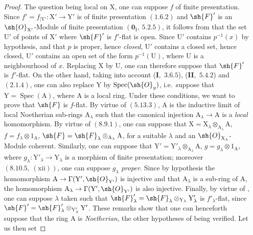 \begin{proof}
The question being local on $\mathrm{X}$, one can suppose $f$ of finite presentation. Since
$f'=f_{|\mathrm{Y}'}:\mathrm{X}'\to\mathrm{Y}'$ is of finite presentation
$(1.6.2)$ and $\sh{F}'$ is an $\sh{O}_{\mathrm{X}'}$-Module of finite presentation $(\mathbf{0}_\mathrm{I},~5.2.5)$, it follows
from  that the set $\mathrm{U}'$ of points of $\mathrm{X}'$ where $\sh{F}'$ is $f'$-flat is open. Since $\mathrm{U}'$
contains $p^{-1}(x)$ by hypothesis, and that $p$ is proper, hence \emph{closed}, $\mathrm{U}'$ contains a closed set, hence closed, $\mathrm{U}'$ contains an
open set of the form $p^{-1}(\mathrm{U})$, where $\mathrm{U}$ is a neighbourhood of $x$. Replacing $\mathrm{X}$ by $\mathrm{U}$, one can therefore
suppose that $\sh{F}'$ is $f'$-flat. On the other hand, taking into account (\textbf{I},~$3.6.5$), (\textbf{II},~$5.4.2$)
and $(2.1.4)$, one can also replace $\mathrm{Y}$ by $\operatorname{Spec}(\sh{O}_y)$, i.e.\ suppose that $\mathrm{Y}=\operatorname{Spec}(\mathrm{A})$,
where $\mathrm{A}$ is a local ring. Under these conditions, we want to prove that $\sh{F}$ is $f$-flat. By virtue
of $(5.13.3)$, $\mathrm{A}$ is the inductive limit of local Noetherian sub-rings $\mathrm{A}_\lambda$ such that
the canonical injection $\mathrm{A}_\lambda\to\mathrm{A}$ is a \emph{local} homomorphism. By virtue of $(8.9.1)$, one
can suppose that $\mathrm{X}=\mathrm{X}_\lambda\otimes_{\mathrm{A}_\lambda}\mathrm{A}$, $f=f_\lambda\otimes 1_\mathrm{A}$, $\sh{F}=\sh{F}_\lambda\otimes_{\mathrm{A}_\lambda}\mathrm{A}$, for a suitable $\lambda$ and an $\sh{O}_{\mathrm{X}_\lambda}$-Module coherent.
Similarly, one can suppose that $\mathrm{Y}'=\mathrm{Y}'_\lambda\otimes_{\mathrm{A}_\lambda}\mathrm{A}$, $g=g_\lambda\otimes 1_\mathrm{A}$, where $g_\lambda:\mathrm{Y}'_\lambda\to\mathrm{Y}_\lambda$ is a
morphism of finite presentation; moreover $(8.10.5,~(\text{xii}))$, one can suppose $g_\lambda$
\emph{proper}. Since by hypothesis the homomorphism $\mathrm{A}\to\Gamma(\mathrm{Y}',\sh{O}_{\mathrm{Y}'})$ is injective and that $\mathrm{A}_\lambda$
is a sub-ring of $\mathrm{A}$, the homomorphism $\mathrm{A}_\lambda\to\Gamma(\mathrm{Y}',\sh{O}_{\mathrm{Y}'})$ is also injective. Finally,
by virtue of , one can suppose $\lambda$ taken such that $\sh{F}'_\lambda=\sh{F}_\lambda\otimes_{\mathrm{Y}_\lambda}\mathrm{Y}'_\lambda$ is $f'_\lambda$-flat,
since $\sh{F}'=\sh{F}'_\lambda\otimes_{\mathrm{Y}'_\lambda}\mathrm{Y}'$. These remarks show that one can henceforth suppose that
the ring $\mathrm{A}$ is \emph{Noetherian}, the other hypotheses of  being verified. Let us then set

\end{proof}
